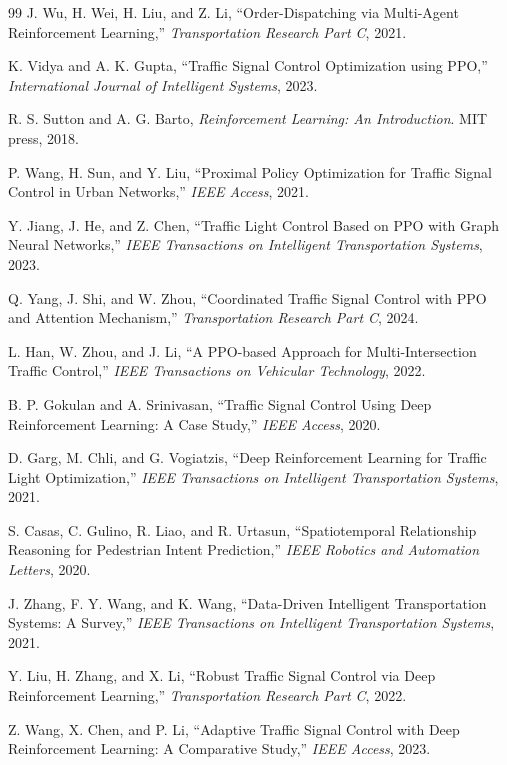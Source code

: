 \documentclass[12pt, a4paper]{report}
\begin{document}
\begin{thebibliography}{99}
 J. Wu, H. Wei, H. Liu, and Z. Li, ``Order-Dispatching via Multi-Agent Reinforcement Learning,'' \textit{Transportation Research Part C}, 2021.

 K. Vidya and A. K. Gupta, ``Traffic Signal Control Optimization using PPO,'' \textit{International Journal of Intelligent Systems}, 2023.

 R. S. Sutton and A. G. Barto, \textit{Reinforcement Learning: An Introduction}. MIT press, 2018.

 P. Wang, H. Sun, and Y. Liu, ``Proximal Policy Optimization for Traffic Signal Control in Urban Networks,'' \textit{IEEE Access}, 2021.

 Y. Jiang, J. He, and Z. Chen, ``Traffic Light Control Based on PPO with Graph Neural Networks,'' \textit{IEEE Transactions on Intelligent Transportation Systems}, 2023.

 Q. Yang, J. Shi, and W. Zhou, ``Coordinated Traffic Signal Control with PPO and Attention Mechanism,'' \textit{Transportation Research Part C}, 2024.

 L. Han, W. Zhou, and J. Li, ``A PPO-based Approach for Multi-Intersection Traffic Control,'' \textit{IEEE Transactions on Vehicular Technology}, 2022.

 B. P. Gokulan and A. Srinivasan, ``Traffic Signal Control Using Deep Reinforcement Learning: A Case Study,'' \textit{IEEE Access}, 2020.

 D. Garg, M. Chli, and G. Vogiatzis, ``Deep Reinforcement Learning for Traffic Light Optimization,'' \textit{IEEE Transactions on Intelligent Transportation Systems}, 2021.

 S. Casas, C. Gulino, R. Liao, and R. Urtasun, ``Spatiotemporal Relationship Reasoning for Pedestrian Intent Prediction,'' \textit{IEEE Robotics and Automation Letters}, 2020.

 J. Zhang, F. Y. Wang, and K. Wang, ``Data-Driven Intelligent Transportation Systems: A Survey,'' \textit{IEEE Transactions on Intelligent Transportation Systems}, 2021.

 Y. Liu, H. Zhang, and X. Li, ``Robust Traffic Signal Control via Deep Reinforcement Learning,'' \textit{Transportation Research Part C}, 2022.

 Z. Wang, X. Chen, and P. Li, ``Adaptive Traffic Signal Control with Deep Reinforcement Learning: A Comparative Study,'' \textit{IEEE Access}, 2023.


\end{thebibliography}
\end{document}
